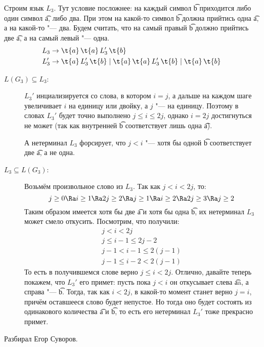 	Строим язык $L_3$.
	Тут условие посложнее: на каждый символ \t{b} приходится либо один символ \t{a}, либо два.
	При этом на какой-то символ \t{b} должна прийтись одна \t{a}, а на какой-то "--- два.
	Будем считать, что на самый правый \t{b} должно прийтись две \t{a}, а на самый левый "--- одна.
	\begin{align*}
		L_3 &\to \t{a}\,\t{a}\,L_3'\,\t{b} \\
		L_3' &\to \t{a}\,L_3'\,\t{b} \mid \t{a}\,\t{a}\,L_3'\,\t{b} \mid \t{a}\,\t{b}
	\end{align*}
	\begin{description}
		\item[$L(G_3) \subseteq L_3$:]
			$L_3'$ инциализируется со слова, в котором $i=j$, а дальше на каждом шаге увеличивает $i$
			на единицу или двойку, а $j$ "--- на единицу.
			Поэтому в словах $L_3'$ будет точно выполнено $j \le i \le 2j$, однако $i=2j$ достигнуться
			не может (так как внутренней \t{b} соответствует лишь одна \t{a}).

			А нетерминал $L_3$ форсирует, что $j < i$ "--- хотя бы одной \t{b} соответствует две \t{a}, а не одна.
		\item[$L_3 \subseteq L(G_3)$:]
			Возьмём произвольное слово из $L_3$.
			Так как $j < i < 2j$, то:
			\[ j \ge 0 \Ra i \ge 1 \Ra 2j \ge 2 \Ra j \ge 1 \Ra i \ge 2 \Ra 2j \ge 3 \Ra j \ge 2 \]
			Таким образом имеется хотя бы две \t{a} и хотя бы одна \t{b}, их нетерминал $L_3$ может смело откусить.
			Посмотрим, что получили:
			\begin{gather*}
				j < i < 2j \\
				j \le i - 1 \le 2j - 2 \\
				j - 1 < i - 1 \le 2(j - 1) \\
				j - 1 \le i - 2 < 2(j - 1)
			\end{gather*}
			То есть в получившемся слове верно $j \le i < 2j$.
			Отлично, давайте теперь покажем, что $L_3'$ его примет: пусть пока $j < i$ он откусывает слева \t{aa}, а справа "--- \t{b}.
			Тогда, так как $i < 2j$, в какой-то момент станет верно $j=i$, причём оставшееся слово будет непустое.
			Но тогда оно будет состоять из одинакового количества \t{a} и \t{b}, то есть его нетерминал $L_3'$ тоже прекрасно примет.
	\end{description}

	Разбирал Егор Суворов.

